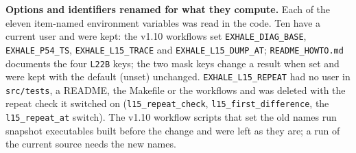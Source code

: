 \documentclass[english,a4paper]{my_memo}
\begin{document}
\textbf{Options and identifiers renamed for what they compute.} Each of the eleven item-named environment variables was read in the code. Ten have a current user and were kept: the v1.10 workflows set \texttt{EXHALE\_DIAG\_BASE}, \texttt{EXHALE\_P54\_TS}, \texttt{EXHALE\_L15\_TRACE} and \texttt{EXHALE\_L15\_DUMP\_AT}; \texttt{README\_HOWTO.md} documents the four \texttt{L22B} keys; the two mask keys change a result when set and were kept with the default (unset) unchanged. \texttt{EXHALE\_L15\_REPEAT} had no user in \texttt{src/tests}, a README, the Makefile or the workflows and was deleted with the repeat check it switched on (\texttt{l15\_repeat\_check}, \texttt{l15\_first\_difference}, the \texttt{l15\_repeat\_at} switch). The v1.10 workflow scripts that set the old names run snapshot executables built before the change and were left as they are; a run of the current source needs the new names.
\end{document}
